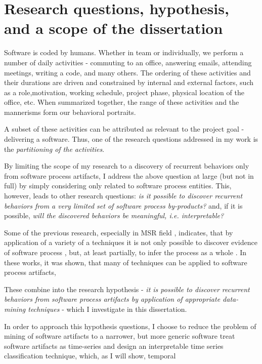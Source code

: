 \section{Research questions, hypothesis, and a scope of the dissertation}
Software is coded by humans. Whether in team or individually, we perform a number of daily activities - 
commuting to an office, answering emails, attending meetings, writing a code, and many others. 
The ordering of these activities and their durations are driven and constrained by internal and external factors, 
such as a role,motivation, working schedule, project phase, physical location of the office, etc. 
When summarized together, the range of these activities and the mannerisms form our behavioral portraits.

A subset of these activities can be attributed as relevant to the project goal - delivering a software. 
Thus, one of the research questions addressed in my work is the \textit{partitioning of the activities}. 

By limiting the scope of my research to a discovery of recurrent behaviors only from software process 
artifacts, I address the above question at large (but not in full) by simply considering only related to software 
process entities.
This, however, leads to other research questions: 
\textit{is it possible to discover recurrent behaviors from a very limited set of software process by-products?} 
and, if it is possible, 
\textit{will the discovered behaviors be meaningful, i.e. interpretable?}

Some of the previous research, especially in MSR field  \cite{citeulike:9114115, citeulike:7853299}, 
indicates, that by application of a variety of a techniques it is not only possible to discover evidence of 
software process \cite{citeulike:9007622}, but, at least partially, to infer the process as a whole \cite{citeulike:5128808}. 
In these works, it was shown, that many of techniques can be applied to software process artifacts, 

These combine into the research hypothesis - \textit{it is possible to discover recurrent behaviors 
from software process artifacts by application of appropriate data-mining techniques} - 
which I investigate in this dissertation. 

In order to approach this hypothesis questions, I choose to reduce the problem of mining of software artifacts to a narrower,
but more generic software treat software artifacts as time-series and design an interpretable time 
series classification technique, which, 
as I will show, temporal 


